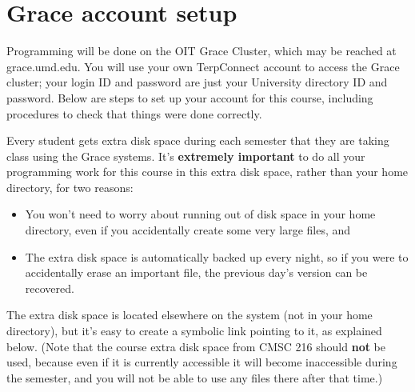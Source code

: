 \documentclass[10pt]{article}
\begin{document}

  \vspace{-5mm}

  \section{Grace account setup}

    Programming will be done on the OIT Grace Cluster, which may be reached at
  grace.umd.edu.  You will use your own TerpConnect account to access the
  Grace cluster; your login ID and password are just your University
  directory ID and password.  Below are steps to set up your account for
  this course, including procedures to check that things were done
  correctly.

    Every student gets extra disk space during each semester that they are
  taking class using the Grace systems.  It's \textbf{extremely important}
  to do all your programming work for this course in this extra disk space,
  rather than your home directory, for two reasons:

    \vspace{-1.5mm}

    \begin{itemize}

      \addtolength{\itemsep}{-1mm}

      \item You won't need to worry about running out of disk space in your
            home directory, even if you accidentally create some very large
            files, and

      \item The extra disk space is automatically backed up every night, so
            if you were to accidentally erase an important file, the
            previous day's version can be recovered.

    \end{itemize}

    \vspace{-1.5mm}

    The extra disk space is located elsewhere on the system (not in your home
  directory), but it's easy to create a symbolic link pointing to it, as
  explained below.  (Note that the course extra disk space from CMSC 216
  should \textbf{not} be used, because even if it is currently accessible it
  will become inaccessible during the semester, and you will not be able to
  use any files there after that time.)
\end{document}
